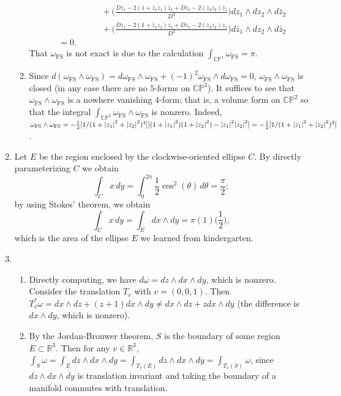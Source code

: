 \documentclass[11pt,leqno]{article}
\theoremstyle{plain}
\theoremstyle{definition}
\numberwithin{equation}{section}
\numberwithin{lem}{section}
\begin{document}
\begin{enumerate}
\begin{enumerate}
\begin{align*}
            &\hspace{5em} + \bigg(\frac{D\bar z_1-2(1+\bar z_1z_1)\bar z_1 + D\bar z_1-2(\bar z_2z_2)\bar z_1}{D^3}\bigg)dz_1\wedge dz_2\wedge d\bar z_2 \\
            &\hspace{5em} + \bigg(\frac{D z_1-2(1+\bar z_1z_1) z_1 + D z_1-2(\bar z_2z_2) z_1}{D^3}\bigg)d\bar z_1\wedge dz_2\wedge d\bar z_2\\
            &= 0.
        \end{align*}
        That $\omega_{\mathrm{FS}}$ is not exact is due to the calculation $\int_{\mathbb{CP}^1}\omega_{\mathrm{FS}} = \pi$.
        \item Since $d(\omega_{\mathrm{FS}}\wedge \omega_{\mathrm{FS}}) = d\omega_{\mathrm{FS}}\wedge \omega_{\mathrm{FS}} + (-1)^2\omega_{\mathrm{FS}}\wedge d\omega_{\mathrm{FS}} = 0$, $\omega_{\mathrm{FS}}\wedge \omega_{\mathrm{FS}}$ is closed (in any case there are no $5$-forms on $\mathbb{CP}^2$). It suffices to see that $\omega_{\mathrm{FS}}\wedge \omega_{\mathrm{FS}}$ is a nowhere vanishing $4$-form; that is, a volume form on $\mathbb{CP}^2$ so that the integral $\int_{\mathbb{CP}^2}\omega_{\mathrm{FS}}\wedge \omega_{\mathrm{FS}}$ is nonzero. Indeed, $\omega_{\mathrm{FS}}\wedge \omega_{\mathrm{FS}} = -\frac{1}{2}[1/(1+\abs{z_1}^2 + \abs{z_2}^2)^4][(1+\abs{z_1}^2)(1+\abs{z_2}^2) - \abs{z_1}^2\abs{z_2}^2] = -\frac{1}{2}[1/(1+\abs{z_1}^2 + \abs{z_2}^2)^3]$.
    \end{enumerate}
    \item Let $E$ be the region enclosed by the clockwise-oriented ellipse $C$. By directly parameterizing $C$ we obtain 
    \[\int_C x\,dy = \int_0^{2\pi}\frac{1}{2}\cos^2(\theta)\,d\theta = \frac{\pi}{2};\]
    by using Stokes' theorem, we obtain
    \[\int_C x\,dy = \int_E dx\wedge dy = \pi(1)\bigg(\frac{1}{2}\bigg),\]
    which is the area of the ellipse $E$ we learned from kindergarten.
    \item \begin{enumerate}
        \item Directly computing, we have $d\omega = dz\wedge dx\wedge dy$, which is nonzero. Consider the translation $T_v$ with $v = (0,0,1)$. Then $T_v^\ast\omega = dx\wedge dz + (z+1)dx \wedge dy\neq dx\wedge dz + zdx \wedge dy$ (the difference is $dx\wedge dy$, which is nonzero).
        \item By the Jordan-Brouwer theorem, $S$ is the boundary of some region $E\subset \mathbb R^3$. Then for any $v\in\mathbb R^3$, $\int_S\omega = \int_E dz\wedge dx\wedge dy = \int_{T_v(E)} dz\wedge dx\wedge dy = \int_{T_v(S)} \omega$, since $dz\wedge dx\wedge dy$ is translation invariant and taking the boundary of a manifold commutes with translation.

\end{enumerate}
\end{enumerate}
\end{document}
